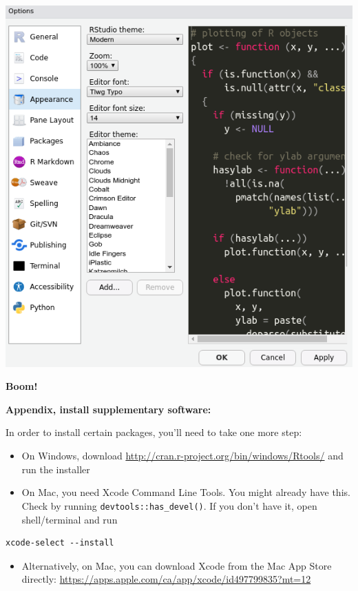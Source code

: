 \documentclass[
]{book}
\providecommand{\tightlist}{%
  \setlength{\itemsep}{0pt}\setlength{\parskip}{0pt}}
\begin{document}
\includegraphics{img/rstudio_theme.png}

\textbf{Boom!}

\textbf{Appendix, install supplementary software:}

In order to install certain packages, you'll need to take one more step:

\begin{itemize}
\tightlist
\item
  On Windows, download \url{http://cran.r-project.org/bin/windows/Rtools/} and run the installer
\item
  On Mac, you need Xcode Command Line Tools. You might already have this. Check by running \texttt{devtools::has\_devel()}. If you don't have it, open shell/terminal and run
\end{itemize}

\begin{verbatim}
xcode-select --install
\end{verbatim}

\begin{itemize}
\tightlist
\item
  Alternatively, on Mac, you can download Xcode from the Mac App Store directly: \url{https://apps.apple.com/ca/app/xcode/id497799835?mt=12}
\end{itemize}
\end{document}
